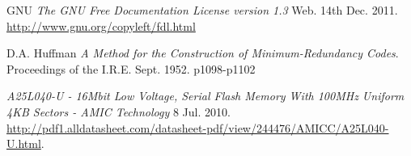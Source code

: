 \begin{thebibliography}{9}
	 GNU \emph{The GNU Free Documentation License version 1.3} Web. 14th Dec. 2011. \url{http://www.gnu.org/copyleft/fdl.html}

	 D.A. Huffman \textit{A Method for the Construction of Minimum-Redundancy Codes}. Proceedings of the I.R.E. Sept. 1952. p1098-p1102

	 \emph{A25L040-U - 16Mbit Low Voltage, Serial Flash Memory With 100MHz Uniform 4KB Sectors - AMIC Technology} 8 Jul. 2010. \url{http://pdf1.alldatasheet.com/datasheet-pdf/view/244476/AMICC/A25L040-U.html}.

\end{thebibliography} 
